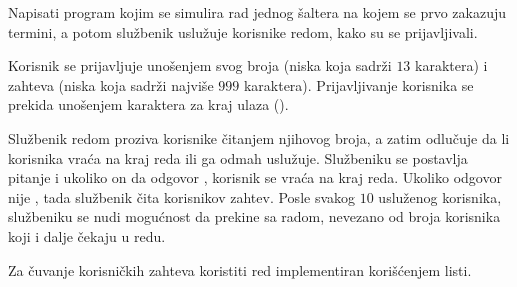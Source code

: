 \begin{Exercise}[label=605]

Napisati program kojim se simulira rad jednog šaltera na kojem se prvo zakazuju 
termini, a potom službenik uslužuje korisnike redom, kako su se prijavljivali.

Korisnik se prijavljuje unošenjem svog  broja (niska koja sadrži $13$ karaktera) i zahteva (niska koja sadrži najviše $999$ karaktera). Prijavljivanje korisnika se prekida unošenjem karaktera za kraj ulaza ().

Službenik redom proziva korisnike čitanjem njihovog  broja, a zatim odlučuje da li 
korisnika vraća na kraj reda ili ga odmah uslužuje. Službeniku se postavlja pitanje 
 i ukoliko on da odgovor , 
korisnik se vraća na kraj reda. Ukoliko odgovor nije , tada službenik čita korisnikov zahtev.  
Posle svakog $10$ usluženog korisnika, službeniku se nudi 
mogućnost da prekine sa radom, nevezano od broja korisnika koji i dalje čekaju u redu. 

Za čuvanje korisničkih zahteva koristiti red implementiran korišćenjem listi.
\end{Exercise}
\begin{Answer}[ref=605]
\end{Answer}



